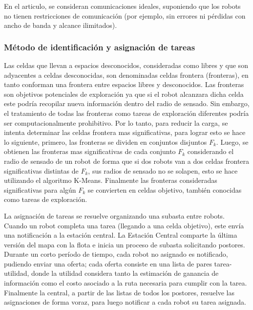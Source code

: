 En el articulo, se consideran comunicaciones ideales, suponiendo que los robots no tienen restricciones de comunicación (por ejemplo, sin errores ni pérdidas con ancho de banda y alcance ilimitados). %

\subsubsection{Método de identificación y asignación de tareas}

Las celdas que llevan a espacios desconocidos, consideradas como libres y que son adyacentes a celdas desconocidas, son denominadas celdas frontera (fronteras), en tanto conforman una frontera entre espacios libres y desconocidos. Las fronteras son objetivos potenciales de exploración ya que si el robot alcanzara dicha celda este podría recopilar nueva información dentro del radio de sensado. Sin embargo, el tratamiento de todas las fronteras como tareas de exploración diferentes podría ser computacionalmente prohibitivo. Por lo tanto, para reducir la carga, se intenta determinar las celdas frontera mas significativas, para lograr esto se hace lo siguiente, primero, las fronteras se dividen en conjuntos disjuntos $F_k$. 
Luego, se obtienen las fronteras mas significativas de cada conjunto $F_k$ considerando el radio de sensado de un robot de forma que si dos robots van a dos celdas frontera significativas distintas de $F_k$, sus radios de sensado no se solapen, esto se hace utilizando el algoritmo K-Means. Finalmente las fronteras consideradas significativas para algún $F_k$ se convierten en celdas objetivo, también conocidas como tareas de exploración.

La asignación de tareas se resuelve organizando una subasta entre robots. Cuando un robot completa una tarea (llegando a una celda objetivo), este envía una notificación a la estación central. La Estación Central comparte la última versión del mapa con la flota e inicia un proceso de subasta solicitando postores. Durante un corto período de tiempo, cada robot no asignado es notificado, pudiendo enviar una oferta; cada oferta consiste en una lista de pares tarea-utilidad, donde la utilidad considera tanto la estimación de ganancia de información como el costo asociado a la ruta necesaria para cumplir con la tarea. Finalmente la central, a partir de las listas de todos los postores, resuelve las asignaciones de forma voraz, para luego notificar a cada robot su tarea asignada.

